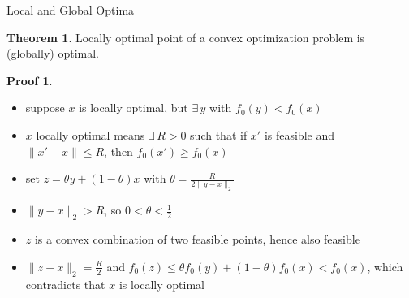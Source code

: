 \documentclass[10pt,handout]{beamer}
\newcommand{\ds}{\displaystyle}
\theoremstyle{definition}
\newtheorem*{thm}{Theorem}
\newtheorem*{prf}{Proof}
\begin{document}
\begin{frame}{Local and Global Optima}
  \begin{thm}
    Locally optimal point of a convex optimization problem is (globally) optimal.
  \end{thm}
  \begin{prf}
    \begin{itemize}\setlength\itemsep{0em}
      \item suppose $x$ is locally optimal, but $\exists\,y$ with $f_0(y) < f_0(x)$
      \item $x$ locally optimal means $\exists\, R > 0$ such that if $x'$ is feasible and $\|x' - x\|\leqslant R$, then $f_0(x')\geqslant f_0(x)$ 
      \item set $\ds z = \theta y + (1 - \theta) x$ with $\ds\theta = \frac{R}{2\|y - x\|_2}$
      \item $\ds\|y - x\|_2 > R$, so $\ds 0 < \theta < \frac{1}{2}$
      \item $z$ is a convex combination of two feasible points, hence also feasible
      \item $\ds\|z - x\|_2 = \frac{R}{2}$ and $f_0(z)\leqslant\theta f_0(y) + (1 - \theta) f_0(x) < f_0(x)$, which contradicts that $x$ is locally optimal
    \end{itemize}
  \end{prf}
\end{frame}

%  
%  
\end{document}
